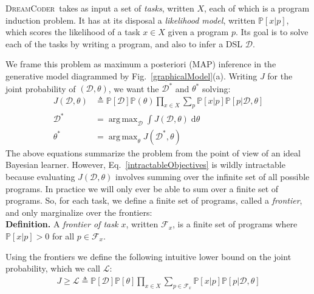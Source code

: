 \documentclass{article}
\newcommand{\system}{\textsc{DreamCoder}~}
\newcommand{\lowerBound}{\mathscr{L}}
\DeclareMathOperator*{\argmax}{arg\,max} %
\newcommand{\probability}{\mathds{P}} %
\begin{document}
\system takes as input a set of \emph{tasks}, written $X$, each of which is a program induction problem.
It has at its disposal a \emph{likelihood model}, written $\probability[x|p]$, which scores the likelihood of a task $x\in X$ given a program $p$.
Its goal is to solve each of the tasks by writing a program,
and also to infer a DSL $\mathcal{D}$.

We frame this problem as maximum a posteriori (MAP) inference in the
generative model diagrammed by Fig.~\ref{graphicalModel}(a). Writing $J$ for the joint probability of $(\mathcal{D},\theta)$, we want the $\mathcal{D}^*$ and $\theta^*$ solving:
\begin{align}\label{intractableObjectives}
\nonumber  J(\mathcal{D},\theta)&\triangleq \probability[\mathcal{D}]\probability(\theta)\prod_{x\in X} \sum_p \probability[x|p]\probability[p|\mathcal{D},\theta]\\
  \mathcal{D}^* &= \argmax_{\mathcal{D}}\int J(\mathcal{D},\theta)\;\mathrm{d}\theta \\
\nonumber  \theta^*& =\argmax_\theta J(\mathcal{D}^*,\theta)
\end{align}
The above equations summarize the problem from the point of view of an ideal Bayesian learner.
However, Eq.~\ref{intractableObjectives}
is wildly intractable because evaluating $J(\mathcal{D},\theta)$ involves
summing over the  infinite set of all possible programs.
In practice we will only ever be able to sum over a finite set of programs.
So, for each task, we define a finite set of programs, called a \emph{frontier}, and only marginalize over the frontiers:
\\\noindent\textbf{Definition.} A \emph{frontier of task $x$}, written $\mathcal{F}_x$,
is a finite set of programs where $\probability[x|p] > 0$ for all $p\in \mathcal{F}_x$.

Using the frontiers we  define the following intuitive lower bound on the joint probability, which we call $\lowerBound$:
\begin{align}
 J\geq \lowerBound\triangleq\probability[\mathcal{D}]\probability[\theta]\prod_{x\in X} \sum_{p\in \mathcal{F}_x} \probability[x|p]\probability[p|\mathcal{D},\theta]
\end{align}

\end{document}
